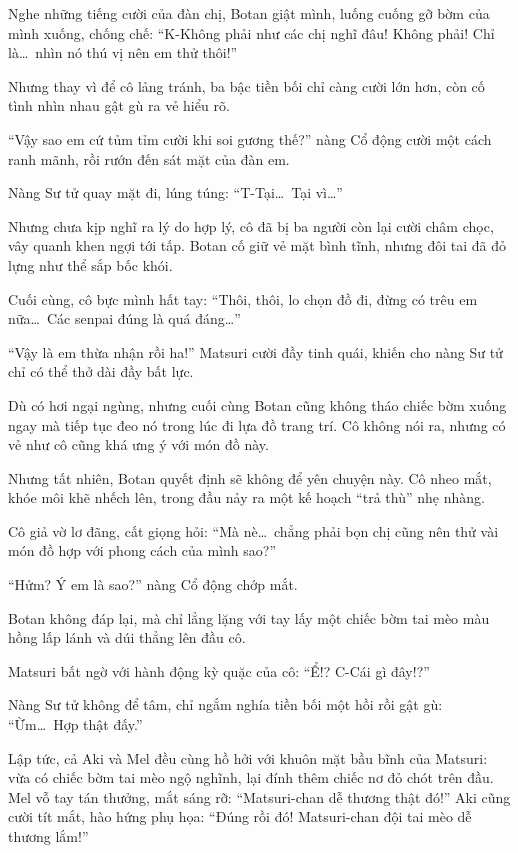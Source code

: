 \documentclass[../main.tex]{subfiles}
\begin{document}
Nghe những tiếng cười của đàn chị, Botan giật mình, luống cuống gỡ bờm của mình xuống, chống chế: ``K-Không phải như các chị nghĩ đâu! Không phải! Chỉ là\dots\ nhìn nó thú vị nên em thử thôi!''

Nhưng thay vì để cô lảng tránh, ba bậc tiền bối chỉ càng cười lớn hơn, còn cố tình nhìn nhau gật gù ra vẻ hiểu rõ.

``Vậy sao em cứ tủm tỉm cười khi soi gương thế?'' nàng Cổ động cười một cách ranh mãnh, rồi rướn đến sát mặt của đàn em.

Nàng Sư tử quay mặt đi, lúng túng: ``T-Tại\dots\ Tại vì\dots''

Nhưng chưa kịp nghĩ ra lý do hợp lý, cô đã bị ba người còn lại cười châm chọc, vây quanh khen ngợi tới tấp. Botan cố giữ vẻ mặt bình tĩnh, nhưng đôi tai đã đỏ lựng như thể sắp bốc khói.

Cuối cùng, cô bực mình hất tay: ``Thôi, thôi, lo chọn đồ đi, đừng có trêu em nữa\dots\ Các senpai đúng là quá đáng\dots''

``Vậy là em thừa nhận rồi ha!'' Matsuri cười đầy tinh quái, khiến cho nàng Sư tử chỉ có thể thở dài đầy bất lực.

Dù có hơi ngại ngùng, nhưng cuối cùng Botan cũng không tháo chiếc bờm xuống ngay mà tiếp tục đeo nó trong lúc đi lựa đồ trang trí. Cô không nói ra, nhưng có vẻ như cô cũng khá ưng ý với món đồ này.

Nhưng tất nhiên, Botan quyết định sẽ không để yên chuyện này. Cô nheo mắt, khóe môi khẽ nhếch lên, trong đầu nảy ra một kế hoạch ``trả thù'' nhẹ nhàng.

Cô giả vờ lơ đãng, cất giọng hỏi: ``Mà nè\dots\ chẳng phải bọn chị cũng nên thử vài món đồ hợp với phong cách của mình sao?''

``Hửm? Ý em là sao?'' nàng Cổ động chớp mắt.

Botan không đáp lại, mà chỉ lẳng lặng với tay lấy một chiếc bờm tai mèo màu hồng lấp lánh và dúi thẳng lên đầu cô.

Matsuri bất ngờ với hành động kỳ quặc của cô: ``Ể!? C-Cái gì đây!?''

Nàng Sư tử không để tâm, chỉ ngắm nghía tiền bối một hồi rồi gật gù: ``Ừm\dots\ Hợp thật đấy.''

Lập tức, cả Aki và Mel đều cùng hồ hởi với khuôn mặt bầu bĩnh của Matsuri: vừa có chiếc bờm tai mèo ngộ nghĩnh, lại đính thêm chiếc nơ đỏ chót trên đầu. Mel vỗ tay tán thưởng, mắt sáng rỡ: ``Matsuri-chan dễ thương thật đó!'' Aki cũng cười tít mắt, hào hứng phụ họa: ``Đúng rồi đó! Matsuri-chan đội tai mèo dễ thương lắm!''
\end{document}
